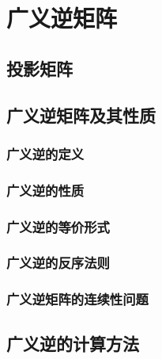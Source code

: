 \chapter{广义逆矩阵}
\label{cha:广义逆矩阵}

\section{投影矩阵}
\label{sec:投影矩阵}

\begin{definition}
\end{definition}

\section{广义逆矩阵及其性质}
\label{sec:广义逆矩阵及其性质}

\subsection{广义逆的定义}
\label{sub:广义逆的定义}

\begin{definition}
\end{definition}

\subsection{广义逆的性质}
\label{sub:广义逆的性质}

\subsection{广义逆的等价形式}
\label{sub:广义逆的等价形式}

\begin{definition}
\end{definition}

\subsection{广义逆的反序法则}
\label{sub:广义逆的反序法则}

\subsection{广义逆矩阵的连续性问题}
\label{sub:广义逆矩阵的连续性问题}

\section{广义逆的计算方法}
\label{sec:广义逆的计算方法}

